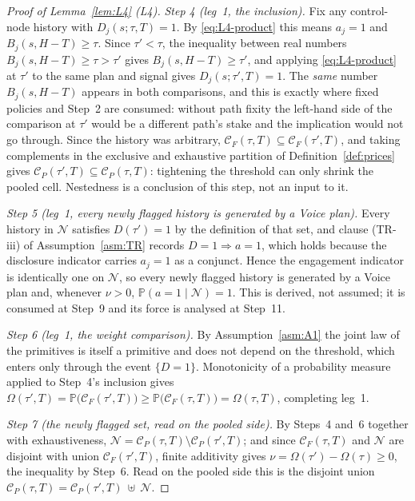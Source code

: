\documentclass[11pt]{article}
\newcommand{\Prb}{\mathbb{P}}
\begin{document}
\begin{proof}[Proof of Lemma~\ref{lem:L4} (L4)]
\emph{Step 4 (leg~1, the inclusion).} Fix any control-node history with $D_j(s;\tau,T) = 1$. By
\eqref{eq:L4-product} this means $a_j = 1$ and $B_j(s,H-T) \ge \tau$. Since $\tau' < \tau$, the
inequality between real numbers $B_j(s,H-T) \ge \tau > \tau'$ gives $B_j(s,H-T) \ge \tau'$, and
applying \eqref{eq:L4-product} at $\tau'$ to the same plan and signal gives $D_j(s;\tau',T) = 1$. The
\emph{same} number $B_j(s,H-T)$ appears in both comparisons, and this is exactly where fixed policies
and Step~2 are consumed: without path fixity the left-hand side of the comparison at $\tau'$ would be
a different path's stake and the implication would not go through. Since the history was arbitrary,
$\mathcal C_F(\tau,T) \subseteq \mathcal C_F(\tau',T)$, and taking complements in the exclusive and
exhaustive partition of Definition~\ref{def:prices} gives
$\mathcal C_P(\tau',T) \subseteq \mathcal C_P(\tau,T)$: tightening the threshold can only shrink the
pooled cell. Nestedness is a conclusion of this step, not an input to it.

\emph{Step 5 (leg~1, every newly flagged history is generated by a Voice plan).} Every history in
$\mathcal N$ satisfies $D(\tau') = 1$ by the definition of that set, and clause (TR-iii) of
Assumption~\ref{asm:TR} records $D = 1 \Rightarrow a = 1$, which holds because the disclosure
indicator carries $a_j = 1$ as a conjunct. Hence the engagement indicator is identically one on
$\mathcal N$, so every newly flagged history is generated by a Voice plan and, whenever $\nu > 0$,
$\Prb(a=1 \mid \mathcal N) = 1$. This is derived, not assumed; it is consumed at Step~9 and its force
is analysed at Step~11.

\emph{Step 6 (leg~1, the weight comparison).} By Assumption~\ref{asm:A1} the joint law of the
primitives is itself a primitive and does not depend on the threshold, which enters only through the
event $\{D=1\}$. Monotonicity of a probability measure applied to Step~4's inclusion gives
$\Omega(\tau',T) = \Prb\bigl(\mathcal C_F(\tau',T)\bigr) \ge \Prb\bigl(\mathcal C_F(\tau,T)\bigr)
= \Omega(\tau,T)$, completing leg~1.

\emph{Step 7 (the newly flagged set, read on the pooled side).} By Steps~4 and~6 together with
exhaustiveness, $\mathcal N = \mathcal C_P(\tau,T)\setminus\mathcal C_P(\tau',T)$; and since
$\mathcal C_F(\tau,T)$ and $\mathcal N$ are disjoint with union $\mathcal C_F(\tau',T)$, finite
additivity gives $\nu = \Omega(\tau')-\Omega(\tau) \ge 0$, the inequality by Step~6. Read on the
pooled side this is the disjoint union
$\mathcal C_P(\tau,T) = \mathcal C_P(\tau',T)\ \uplus\ \mathcal N$.


\end{proof}
\end{document}
